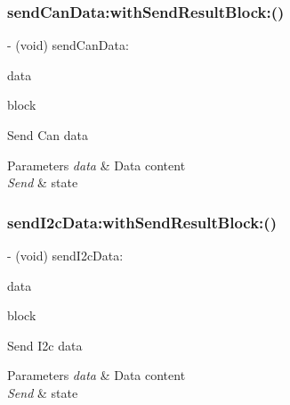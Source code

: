 \subsubsection{\texorpdfstring{send\+Can\+Data\+:with\+Send\+Result\+Block\+:()}{sendCanData:withSendResultBlock:()}}
{\footnotesize\ttfamily -\/ (void) send\+Can\+Data\+: \begin{DoxyParamCaption}\item[{(\hyperlink{struct_p_v_s_d_k___m_o_u_n_t_a_p_i___c_a_n___d_a_t_a}{P\+V\+S\+D\+K\+\_\+\+M\+O\+U\+N\+T\+A\+P\+I\+\_\+\+C\+A\+N\+\_\+\+D\+A\+TA})}]{data }\item[{withSendResultBlock:(P\+V\+Send\+Data\+Result\+Block)}]{block }\end{DoxyParamCaption}}

Send Can data


\begin{DoxyParams}{Parameters}
{\em data} & Data content \\
\hline
{\em Send} & state \\
\hline
\end{DoxyParams}
\mbox{\label{interface_p_v_mount_controller_ae335b4ef316509c888934b79978de043}} 
\subsubsection{\texorpdfstring{send\+I2c\+Data\+:with\+Send\+Result\+Block\+:()}{sendI2cData:withSendResultBlock:()}}
{\footnotesize\ttfamily -\/ (void) send\+I2c\+Data\+: \begin{DoxyParamCaption}\item[{(\hyperlink{struct_p_v_s_d_k___m_o_u_n_t_a_p_i___i2_c___d_a_t_a}{P\+V\+S\+D\+K\+\_\+\+M\+O\+U\+N\+T\+A\+P\+I\+\_\+\+I2\+C\+\_\+\+D\+A\+TA})}]{data }\item[{withSendResultBlock:(P\+V\+Send\+Data\+Result\+Block)}]{block }\end{DoxyParamCaption}}

Send I2c data


\begin{DoxyParams}{Parameters}
{\em data} & Data content \\
\hline
{\em Send} & state \\
\hline
\end{DoxyParams}
\mbox{\label{interface_p_v_mount_controller_abf965f0757a777c6e6c344f988feaed9}} 
